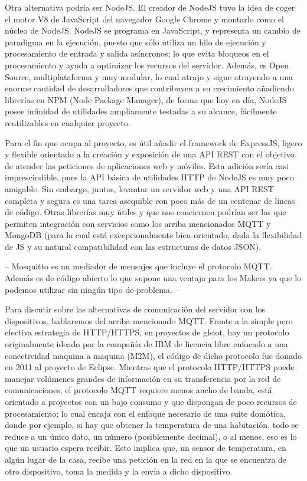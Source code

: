 \vspace{1cm}

Otra alternativa podría ser NodeJS. El creador de NodeJS tuvo la idea de coger el motor V8 de JavaScript del navegador Google Chrome y montarlo como el núcleo de NodeJS. NodeJS se programa en JavaScript, y representa un cambio de paradigma en la ejecución, puesto que sólo utiliza un hilo de ejecución y procesamiento de entrada y salida asíncronos; lo que evita bloqueos en el procesamiento y ayuda a optimizar los recursos del servidor.  Además, es Open Source, multiplataforma y muy modular, lo cual atrajo y sigue atrayendo a una enorme cantidad de desarrolladores que contribuyen a su crecimiento añadiendo librerías en NPM (Node Package Manager), de forma que hoy en día, NodeJS posee infinidad de utilidades ampliamente testadas a su alcance, fácilmente reutilizables en cualquier proyecto.

\vspace{1cm}

Para el fin que ocupa al proyecto, es útil añadir el \gls{framework} de ExpressJS, ligero y flexible orientado a la creación y exposición de una API REST con el objetivo de atender las peticiones de aplicaciones web y móviles. Esta adición sería casi imprescindible, pues la API básica de utilidades HTTP de NodeJS es muy poco amigable. Sin embargo, juntos, levantar un servidor web y una API REST completa y segura es una tarea asequible con poco más de un centenar de lineas de código. Otras librerías muy útiles y que nos conciernen podrían ser las que permiten integración con servicios como los arriba mencionados MQTT y MongoDB (para la cual está excepcionalmente bien orientado, dada la flexibilidad de JS y su natural compatibilidad con las estructuras de datos JSON).

\vspace{1cm}
--
Mosquitto es un mediador de mensajes que incluye el protocolo MQTT. Además es de código abierto lo que supone una ventaja para los Makers ya que lo podemos utilizar sin ningún tipo de problema.
--
\vspace{1cm}

Para discutir sobre las alternativas de comunicación del servidor con los dispositivos, hablaremos del arriba mencionado MQTT. Frente a la simple pero efectiva estrategia de HTTP/HTTPS, en proyectos de gls{iot}, hay un protocolo originalmente ideado por la compañía de IBM de licencia libre enfocado a una conectividad maquina a maquina (M2M), el código de dicho protocolo fue donado en 2011 al proyecto de Eclipse. Mientras que el protocolo HTTP/HTTPS puede manejar volúmenes grandes de información en su transferencia por la red de comunicaciones, el protocolo MQTT requiere menos ancho de banda, está orientado a proyectos con un bajo consumo y que dispongan de poco recursos de procesamiento; lo cual encaja con el enfoque necesario de una suite domótica, donde por ejemplo, si hay que obtener la temperatura de una habitación, todo se reduce a un único dato, un número (posiblemente decimal), o al menos, eso es lo que un usuario espera recibir. Esto implica que, un sensor de temperatura, en algún lugar de la casa, recibe una petición en la red en la que se encuentra de otro dispositivo, toma la medida y la envía a dicho dispositivo.

